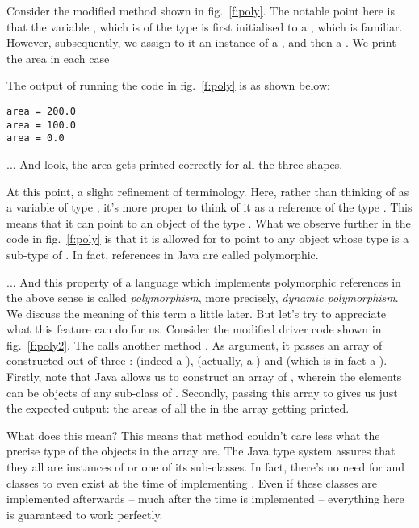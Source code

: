 \documentclass[12pt,a4paper]{article}
\begin{document}
Consider the modified \lstinline@main@ method shown in fig.~\ref{f:poly}. The notable point here is that the variable \lstinline@r@, which is of the type \lstinline@Rectangle@ is first initialised to a \lstinline@Rectangle@, which is familiar. However, subsequently, we assign to it an instance of a \lstinline@Square@, and then a \lstinline@Point@. We print the area in each case

The output of running the code in fig.~\ref{f:poly} is as shown below:
\begin{lstlisting}[frame=single]
area = 200.0
area = 100.0
area = 0.0
\end{lstlisting}

... And look, the area gets printed correctly for all the three shapes.

At this point, a slight refinement of terminology. Here, rather than thinking of \lstinline@r@ as a variable of type \lstinline@Rectangle@, it's more proper to think of it as a reference of the type \lstinline@Rectangle@. This means that it can point to an object of the type \lstinline@Rectangle@. What we observe further in the code in fig.~\ref{f:poly} is that it is allowed for \lstinline@r@ to point to any object whose type is a sub-type of \lstinline@Rectangle@. In fact, references in Java are called polymorphic.

... And this property of a language which implements polymorphic references in the above sense is called \emph{polymorphism}, more precisely, \emph{dynamic polymorphism}. We discuss the meaning of this term a little later. But let's try to appreciate what this feature can do for us. Consider the modified driver code shown in fig.~\ref{f:poly2}. The \lstinline@main@ calls another method \lstinline@printRectangles@. As argument, it passes an array of \lstinline@Rectangle@s constructed out of three \lstinline@Rectangle@s: \lstinline@r@ (indeed a \lstinline@Rectangle@), \lstinline@s@ (actually, a \lstinline@Square@) and \lstinline@p@ (which is in fact a \lstinline@Point@). Firstly, note that Java allows us to construct an array of \lstinline@Rectangle@s, wherein the elements can be objects of any sub-class of \lstinline@Rectangle@. Secondly, passing this array to \lstinline@printRectangles@ gives us just the expected output: the areas of all the \lstinline@Rectangle@s in the array getting printed.

What does this mean? This means that \lstinline@printRectangles@ method couldn't care less what the precise type of the objects in the \lstinline@rarray@ array are. The Java type system assures that they all are instances of \lstinline@Rectangle@ or one of its sub-classes. In fact, there's no need for \lstinline@Square@ and \lstinline@Point@ classes to even exist at the time of implementing \lstinline@printRectangles@. Even if these classes are implemented afterwards -- much after the time \lstinline@printRectangles@ is implemented -- everything here is guaranteed to work perfectly.
\end{document}
